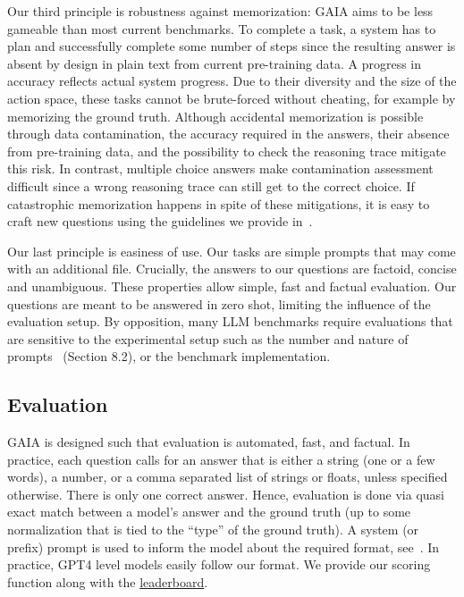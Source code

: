 \documentclass{fairmeta}
\newcommand{\benchmark}{\textsc{GAIA}}
\begin{document}
Our third principle is robustness against memorization: \benchmark{} aims to be less gameable than most current benchmarks. To complete a task, a system has to plan and successfully complete some number of steps since the resulting answer is absent by design in plain text from current pre-training data. A progress in accuracy reflects actual system progress. Due to their diversity and the size of the action space, these tasks cannot be brute-forced without cheating, for example by memorizing the ground truth. Although accidental memorization is possible through data contamination, the accuracy required in the answers,
their absence from pre-training data, and the possibility to check the reasoning trace mitigate this risk. In contrast, multiple choice answers make contamination assessment difficult since a wrong reasoning trace can still get to the correct choice.
If catastrophic memorization happens in spite of these mitigations, it is easy to craft new questions using the guidelines we provide in~.

Our last principle is easiness of use. Our tasks are simple prompts that may come with an additional file. Crucially, the answers to our questions are factoid, concise and unambiguous. These properties allow simple, fast and factual evaluation. Our questions are meant to be answered in zero shot, limiting the influence of the evaluation setup. By opposition, many LLM benchmarks require evaluations that are sensitive to the experimental setup such as the number and nature of prompts~\citep{liang2022holistic} (Section 8.2), or the benchmark implementation.


\subsection{Evaluation} \benchmark{} is designed such that evaluation is automated, fast, and factual. In practice, each question calls for an answer that is either a string (one or a few words), a number, or a comma separated list of strings or floats, unless specified otherwise. There is only one correct answer. Hence, evaluation is done via quasi exact match between a model's answer and the ground truth (up to some normalization that is tied to the ``type'' of the ground truth). A system (or prefix) prompt is used to inform the model about the required format, see~. In practice, GPT4 level models easily follow our format. We provide our scoring function along with the \href{https://huggingface.co/gaia-benchmark}{leaderboard}.
\end{document}
